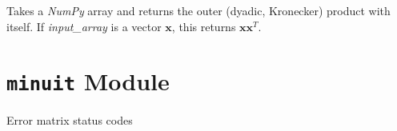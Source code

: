 \documentclass[a4paper,10pt,english]{sphinxmanual}
\begin{document}

\begin{fulllineitems}
\label{index:kafe.function_tools.outer_product}
Takes a \emph{NumPy} array and returns the outer (dyadic, Kronecker) product
with itself. If \emph{input\_array} is a vector $\mathbf{x}$, this returns
$\mathbf{x}\mathbf{x}^T$.

\end{fulllineitems}



\section{\texttt{minuit} Module}
\label{index:module-kafe.minuit}\label{index:minuit-module}\label{index:module-minuit}

\begin{fulllineitems}
\label{index:kafe.minuit.D_MATRIX_ERROR}
Error matrix status codes

\end{fulllineitems}

\end{document}
